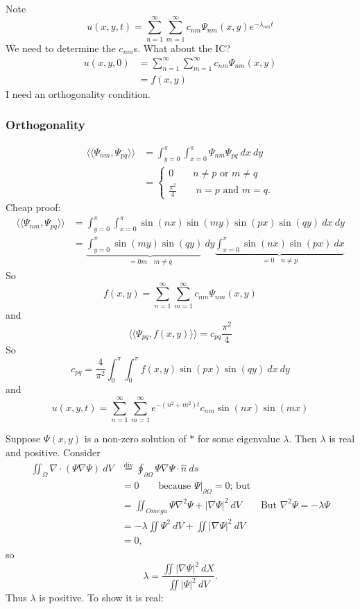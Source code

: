 \documentclass{article}
\newcommand{\nhat}{\hat{n}}
\begin{document}
Note
\[u(x,y,t) = \sum_{n = 1}^{\infty} \sum_{m = 1}^{\infty} c_{nm} \Psi_{nm}(x,y)
    e^{-\lambda_{nm}t}\]
We need to determine the $c_{nm}$s. What about the IC?
\begin{align*}
u(x,y,0) &= \sum_{n = 1}^{\infty} \sum_{m = 1}^{\infty} c_{nm} \Psi_{nm}(x,y) \\
         &= f(x,y)
\end{align*}
I need an orthogonality condition.
\subsubsection{Orthogonality}
\begin{align*}
\langle \langle \Psi_{nm}, \Psi_{pq} \rangle \rangle &= \int_{y=0}^{\pi} \int_{x
    = 0}^\pi \Psi_{nm} \Psi_{pq} ~dx~dy \\
    &= \begin{cases} 0 \qquad n \neq p \text{ or } m \neq q \\
    \frac{\pi^2}{4} \qquad n = p \text{ and } m = q . \end{cases}
\end{align*}
Cheap proof:
\begin{align*}
\langle \langle \Psi_{nm}, \Psi_{pq} \rangle \rangle &= \int_{y = 0}^\pi \int_{x
    = 0}^\pi \sin(nx) \sin(my) \sin(px) \sin(qy) ~dx~dy \\
    &= \underbrace{ \int_{y = 0}^\pi \sin(my) \sin(qy)~dy}_{= 0 m \quad m \neq
        q} \underbrace{\int_{x = 0}^\pi \sin(nx) \sin(px)~dx}_{=0 \quad n \neq
            p}
\end{align*}
So
\[f(x,y) = \sum_{n = 1}^\infty \sum_{m = 1}^\infty c_{nm} \Psi_{nm}(x,y) \]
and
\[\langle \langle \Psi_{pq}, f(x,y) \rangle \rangle = c_{pq} \frac{\pi^2}{4}\]
So
\[c_{pq} = \frac{4}{\pi^2} \int_0^\pi \int_0^\pi f(x,y) \sin(px)
    \sin(qy)~dx~dy\]
and
\[ u(x,y,t) = \sum_{n = 1}^\infty \sum_{m = 1}^\infty e^{-(n^2 + m^2) t} c_{nm}
\sin(nx) \sin(mx)\]

\thm
Suppose $\Psi(x,y)$ is a non-zero solution of $\ast$ for some eigenvalue
$\lambda$. Then $\lambda$ is real and positive.
\xthm
\prf
Consider
\begin{align*}
\iint_{\Omega} \nabla \cdot (\Psi \nabla \Psi)~dV &\stackrel{\text{div}}{=} 
\oint_{\partial \Omega} \Psi \nabla \Psi \cdot \nhat~ds \\
    &= 0 \qquad \text{because $\Psi |_{\partial \Omega} = 0$; but} \\
    &= \iint_{Omega} \Psi \nabla^2 \Psi + |\nabla \Psi|^2~dV \qquad \text{But
        $\nabla^2 \Psi = - \lambda \Psi$} \\
    &= - \lambda \iint \Psi^2~dV + \iint|\nabla \Psi|^2~dV \\
    &= 0,
\end{align*}
so
\[ \lambda = \frac{\iint |\nabla \Psi|^2~dX}{\iint |\Psi|^2~dV}.\]
Thus $\lambda$ is positive. To show it is real:
\end{document}
